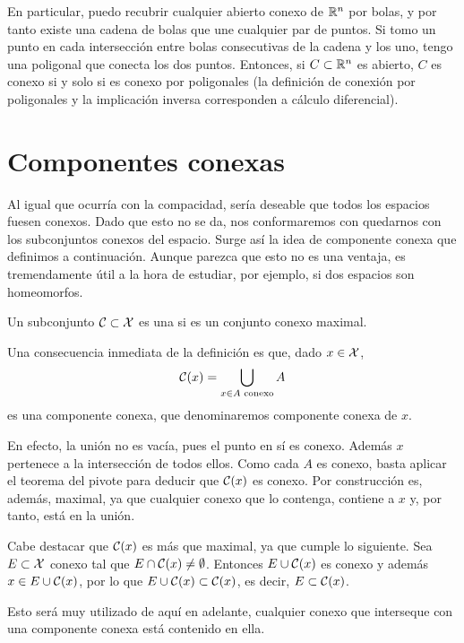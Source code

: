 \begin{obs}
	En particular, puedo recubrir cualquier abierto conexo de $\mathbb{R}^n$ por bolas, y por tanto existe una cadena de bolas que une cualquier par de puntos. Si tomo un punto en cada intersección entre bolas consecutivas de la cadena y los uno, tengo una poligonal que conecta los dos puntos. Entonces, si $C\subset\mathbb{R}^n$ es abierto, $C$ es conexo si y solo si es conexo por poligonales (la definición de conexión por poligonales y la implicación inversa corresponden a cálculo diferencial).
\end{obs}

\section{Componentes conexas}

Al igual que ocurría con la compacidad, sería deseable que todos los espacios fuesen conexos. Dado que esto no se da, nos conformaremos con quedarnos con los subconjuntos conexos del espacio. Surge así la idea de componente conexa que definimos a continuación. Aunque parezca que esto no es una ventaja, es tremendamente útil a la hora de estudiar, por ejemplo, si dos espacios son homeomorfos.

\begin{defi}
	Un subconjunto $\mathcal{C}\subset\mathcal{X}$ es una  si es un conjunto conexo maximal.
\end{defi}

Una consecuencia inmediata de la definición es que, dado $x\in\mathcal{X}$,
\begin{equation}
	\mathcal{C}(x)=\bigcup_{x\in A \text{ conexo}} A
\end{equation}
es una componente conexa, que denominaremos componente conexa de $x$.

En efecto, la unión no es vacía, pues el punto en sí es conexo. Además $x$ pertenece a la intersección de todos ellos. Como cada $A$ es conexo, basta aplicar el teorema del pivote para deducir que $\mathcal{C}(x)$ es conexo. Por construcción es, además, maximal, ya que cualquier conexo que lo contenga, contiene a $x$ y, por tanto, está en la unión.

Cabe destacar que $\mathcal{C}(x)$ es más que maximal, ya que cumple lo siguiente. Sea $E\subset\mathcal{X}$ conexo tal que $E\cap \mathcal{C}(x)\not=\emptyset$. Entonces $E\cup \mathcal{C}(x)$ es conexo y además $x\in E\cup \mathcal{C}(x)$, por lo que $E\cup \mathcal{C}(x)\subset \mathcal{C}(x)$, es decir, $E\subset \mathcal{C}(x)$.

Esto será muy utilizado de aquí en adelante, cualquier conexo que interseque con una componente conexa está contenido en ella.

